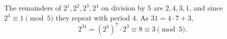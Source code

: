 The remainders of $2^1,2^2,2^3,2^4$ on division by $5$ are $2,4,3,1$, and since $2^4\equiv1\pmod5$ they repeat with period $4$. As $31=4\cdot7+3$,
\[
2^{31}=\left(2^4\right)^7\cdot2^3\equiv8\equiv\boxed{3}\pmod5 .
\]
